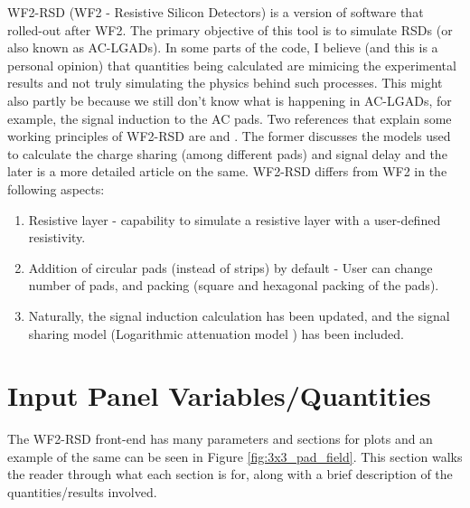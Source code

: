 \documentclass[11pt]{article}
\begin{document}
WF2-RSD (WF2 - Resistive Silicon Detectors) is a version of software that rolled-out after WF2. The primary objective of this tool is to simulate RSDs (or also known as AC-LGADs). In some parts of the code, I believe (and this is a personal opinion) that quantities being calculated are mimicing the experimental results and not truly simulating the physics behind such processes. This might also partly be because we still don't know what is happening in AC-LGADs, for example, the signal induction to the AC pads.
\newline
Two references that explain some working principles of WF2-RSD are \cite{wf2-rsd-working-principles} and \cite{Tornago2021}. The former discusses the models used to calculate the charge sharing (among different pads) and signal delay and the later is a more detailed article on the same.
\newline
WF2-RSD differs from WF2 in the following aspects:
\begin{enumerate}
    \item Resistive layer - capability to simulate a resistive layer with a user-defined resistivity.
    \item Addition of circular pads (instead of strips) by default - User can change number of pads, and packing (square and hexagonal packing of the pads).
    \item Naturally, the signal induction calculation has been updated, and the signal sharing model (Logarithmic attenuation model \cite{Tornago2021}) has been included.
\end{enumerate}

\section{Input Panel Variables/Quantities}
The WF2-RSD front-end has many parameters and sections for plots and an example of the same can be seen in Figure \ref{fig:3x3_pad_field}. This section walks the reader through what each section is for, along with a brief description of the quantities/results involved.
\end{document}
